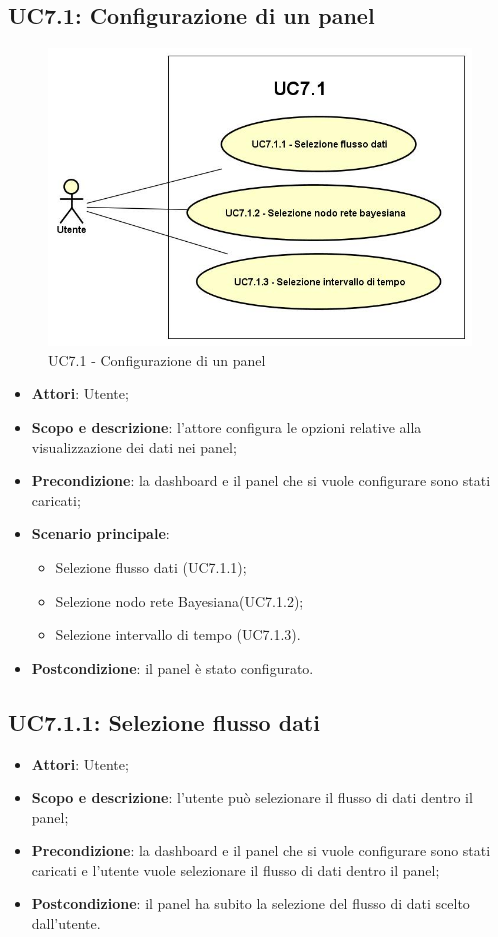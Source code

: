\subsection{UC7.1: Configurazione di un panel}
\hypertarget{UC7.1}{}
\begin{figure} [H]
	\centering
	\includegraphics[scale=0.45]{Img/UC7-1}
	\caption{UC7.1 - Configurazione di un panel}\label{}
\end{figure}
\begin{itemize}
	\item \textbf{Attori}: Utente;
	\item \textbf{Scopo e descrizione}: l'attore configura le opzioni relative alla visualizzazione dei dati nei panel;
	\item \textbf{Precondizione}: la dashboard e il panel che si vuole configurare sono stati caricati;
	\item \textbf{Scenario principale}:
	\begin{itemize}
		\item Selezione flusso dati  (UC7.1.1);
		\item Selezione nodo rete Bayesiana(UC7.1.2);
		\item Selezione intervallo di tempo (UC7.1.3).		
	\end{itemize}
	\item \textbf{Postcondizione}: il panel è stato configurato.
\end{itemize}
\subsection{UC7.1.1: Selezione flusso dati}
\hypertarget{UC7.1.1}{}
\begin{itemize}
	\item \textbf{Attori}: Utente;
	\item \textbf{Scopo e descrizione}: l'utente può selezionare il flusso di dati dentro il panel;
	\item \textbf{Precondizione}: la dashboard e il panel che si vuole configurare sono stati caricati e l'utente vuole selezionare il flusso di dati dentro il panel;
	\item \textbf{Postcondizione}: il panel ha subito la selezione del flusso di dati scelto dall'utente.
\end{itemize}
